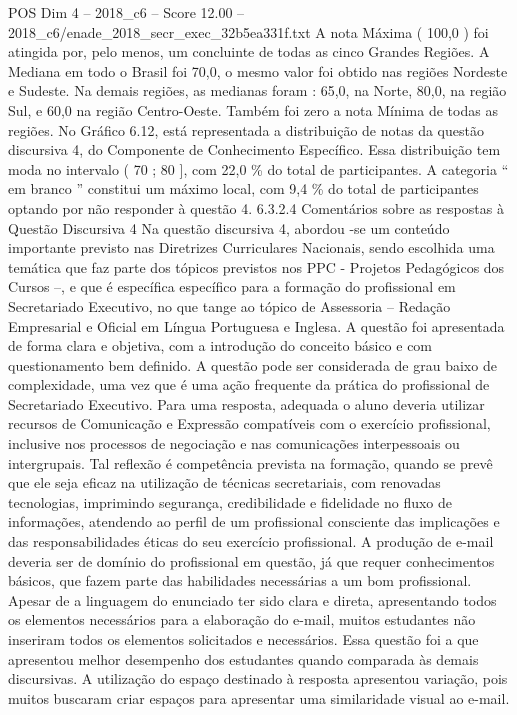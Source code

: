 \begin{textsample}{POS Dim 4 – 2018\_c6 – Score 12.00 – 2018\_c6/enade\_2018\_secr\_exec\_32b5ea331f.txt}
A nota Máxima ( 100,0 ) foi atingida por, pelo menos, um concluinte de todas as cinco Grandes Regiões.
A Mediana em todo o Brasil foi 70,0, o mesmo valor foi obtido nas regiões Nordeste e Sudeste.
Na demais regiões, as medianas foram : 65,0, na Norte, 80,0, na região Sul, e 60,0 na região Centro-Oeste.
Também foi zero a nota Mínima de todas as regiões.
No Gráfico 6.12, está representada a distribuição de notas da questão discursiva 4, do Componente de Conhecimento Específico.
Essa distribuição tem moda no intervalo ( 70 ; 80 ], com 22,0 \% do total de participantes.
A categoria “ em branco ” constitui um máximo local, com 9,4 \% do total de participantes optando por não responder à questão 4. 6.3.2.4 Comentários sobre as respostas à Questão Discursiva 4 Na questão discursiva 4, abordou -se um conteúdo importante previsto nas Diretrizes Curriculares Nacionais, sendo escolhida uma temática que faz parte dos tópicos previstos nos PPC - Projetos Pedagógicos dos Cursos –, e que é específica específico para a formação do profissional em Secretariado Executivo, no que tange ao tópico de Assessoria – Redação Empresarial e Oficial em Língua Portuguesa e Inglesa.
A questão foi apresentada de forma clara e objetiva, com a introdução do conceito básico e com questionamento bem definido.
A questão pode ser considerada de grau baixo de complexidade, uma vez que é uma ação frequente da prática do profissional de Secretariado Executivo.
Para uma resposta, adequada o aluno deveria utilizar recursos de Comunicação e Expressão compatíveis com o exercício profissional, inclusive nos processos de negociação e nas comunicações interpessoais ou intergrupais.
Tal reflexão é competência prevista na formação, quando se prevê que ele seja eficaz na utilização de técnicas secretariais, com renovadas tecnologias, imprimindo segurança, credibilidade e fidelidade no fluxo de informações, atendendo ao perfil de um profissional consciente das implicações e das responsabilidades éticas do seu exercício profissional.
A produção de e-mail deveria ser de domínio do profissional em questão, já que requer conhecimentos básicos, que fazem parte das habilidades necessárias a um bom profissional.
Apesar de a linguagem do enunciado ter sido clara e direta, apresentando todos os elementos necessários para a elaboração do e-mail, muitos estudantes não inseriram todos os elementos solicitados e necessários.
Essa questão foi a que apresentou melhor desempenho dos estudantes quando comparada às demais discursivas.
A utilização do espaço destinado à resposta apresentou variação, pois muitos buscaram criar espaços para apresentar uma similaridade visual ao e-mail.

\end{textsample}
